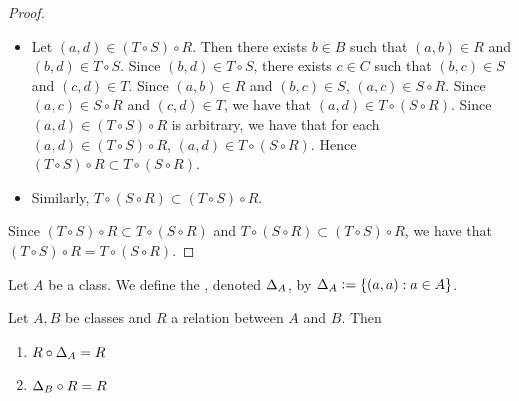 \documentclass{book}
\begin{document}
	\begin{proof}\
		\begin{itemize}
			\item Let $(a,d) \in (T \circ S) \circ R$. Then there exists $b \in B$ such that $(a,b) \in R$ and $(b,d) \in T \circ S$. Since $(b,d) \in T \circ S$, there exists $c \in C$ such that $(b,c) \in S$ and $(c,d) \in T$. Since $(a,b) \in R$ and $(b,c) \in S$, $(a,c) \in S \circ R$. Since $(a,c) \in S \circ R$ and $(c,d) \in T$, we have that $(a,d) \in T \circ (S \circ R)$. Since $(a,d) \in (T \circ S) \circ R$ is arbitrary, we have that for each $(a,d) \in (T \circ S) \circ R$, $(a,d) \in T \circ (S \circ R)$. Hence $(T \circ S) \circ R \subset T \circ (S \circ R)$.
			\item Similarly, $T \circ (S \circ R) \subset (T \circ S) \circ R$. 
		\end{itemize}
		Since $(T \circ S) \circ R \subset T \circ (S \circ R)$ and $T \circ (S \circ R) \subset (T \circ S) \circ R$, we have that $(T \circ S) \circ R = T \circ (S \circ R)$.
		
	\end{proof}
	
	
	
	\begin{defn}
		Let $A$ be a class. We define the , denoted $\Delta_A$, by $\Delta_A \vcentcolon= \{(a,a): a \in A\}$. 
	\end{defn}
	
	\begin{ex}
		Let $A, B$ be classes and $R$ a relation between $A$ and $B$. Then 
		\begin{enumerate}
			\item $R \circ \Delta_A = R$
			\item $\Delta_B \circ R = R$
		\end{enumerate}
	\end{ex}
	
\end{document}
